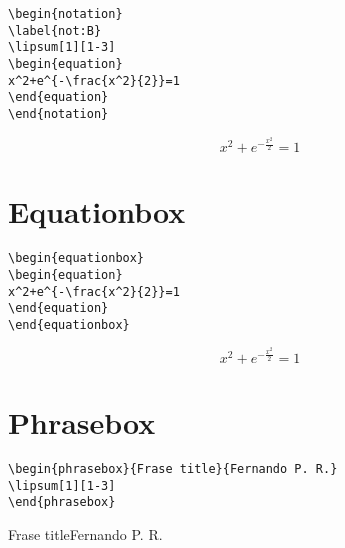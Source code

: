 \begin{highlightbox}
\begin{verbatim}
\begin{notation}
\label{not:B}
\lipsum[1][1-3]
\begin{equation}
x^2+e^{-\frac{x^2}{2}}=1
\end{equation}
\end{notation}
\end{verbatim}
\end{highlightbox}
\begin{notation}
\label{not:B}
\lipsum[1][1-3]
\begin{equation}
x^2+e^{-\frac{x^2}{2}}=1
\end{equation}
\end{notation}






\section{Equationbox}

\begin{highlightbox}
\begin{verbatim}
\begin{equationbox}
\begin{equation}
x^2+e^{-\frac{x^2}{2}}=1
\end{equation}
\end{equationbox}
\end{verbatim}
\end{highlightbox}
\begin{equationbox}
\begin{equation}
x^2+e^{-\frac{x^2}{2}}=1
\end{equation}
\end{equationbox}


\section{Phrasebox}
\begin{highlightbox}
\begin{verbatim}
\begin{phrasebox}{Frase title}{Fernando P. R.}
\lipsum[1][1-3]
\end{phrasebox}
\end{verbatim}
\end{highlightbox}
\begin{phrasebox}{Frase title}{Fernando P. R.}
\lipsum[1][1-3]
\end{phrasebox}

